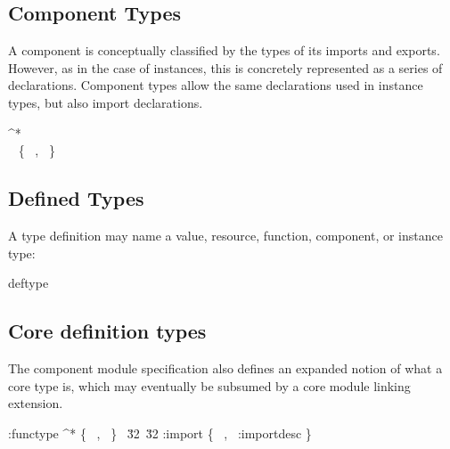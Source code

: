 \subsection{Component Types}

A component is conceptually classified by the types of its imports and
exports. However, as in the case of instances, this is concretely
represented as a series of declarations. Component types allow the
same declarations used in instance types, but also import declarations.

\begin{sum-productions}
   \componentdecl^{*}\\
    \instancedecl \alt
    \CDIMPORT~\importdecl
    \{ \IDNAME~\name, \IDDESC~\externdesc \}
\end{sum-productions}

\subsection{Defined Types}

A type definition may name a value, resource, function, component, or
instance type:

\begin{sum-production}{deftype}
   \alt \resourcetype \alt \functype \alt \componenttype
  \alt \instancetype
\end{sum-production}

\subsection{Core definition types}

The component module specification also defines an expanded notion of
what a core type is, which may eventually be subsumed by a core module
linking extension.

\begin{sum-productions}
    \core:functype \alt \coremoduletype
   \coremoduledecl^{*}
    \coreimportdecl \alt
    \coredeftype \alt
    \corealias \alt
    \coreexportdecl \alt
   \{ \CASORT~\coresort, \CATARGET~\corealiastarget \}
   \CATOUTER~\u32~\u32
   \core:import
   \{ \CEDNAME~\name, \CEDDESC~\core:importdesc \}
\end{sum-productions}
